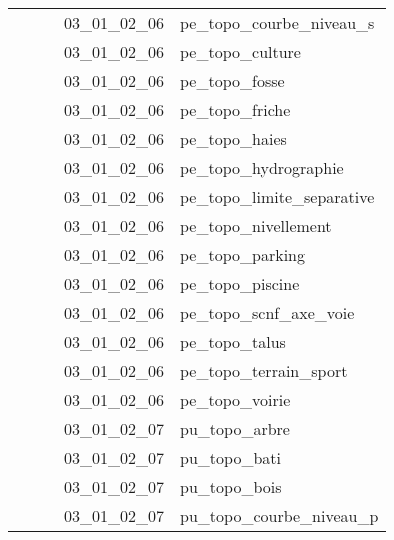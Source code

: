\documentclass[12pt,titlepage]{book}
\begin{document}
\begin{supertabular}{|p{7.5cm}|p{7.5cm}|p{7.5cm}|c|p{10cm}|}
                   &                    &                    & 03\_01\_02\_06 & pe\_topo\_courbe\_niveau\_s\\
                   &                    &                    & 03\_01\_02\_06 & pe\_topo\_culture\\
                   &                    &                    & 03\_01\_02\_06 & pe\_topo\_fosse\\
                   &                    &                    & 03\_01\_02\_06 & pe\_topo\_friche\\
                   &                    &                    & 03\_01\_02\_06 & pe\_topo\_haies\\
                   &                    &                    & 03\_01\_02\_06 & pe\_topo\_hydrographie\\
                   &                    &                    & 03\_01\_02\_06 & pe\_topo\_limite\_separative\\
                   &                    &                    & 03\_01\_02\_06 & pe\_topo\_nivellement\\
                   &                    &                    & 03\_01\_02\_06 & pe\_topo\_parking\\
                   &                    &                    & 03\_01\_02\_06 & pe\_topo\_piscine\\
                   &                    &                    & 03\_01\_02\_06 & pe\_topo\_scnf\_axe\_voie\\
                   &                    &                    & 03\_01\_02\_06 & pe\_topo\_talus\\
                   &                    &                    & 03\_01\_02\_06 & pe\_topo\_terrain\_sport\\
                   &                    &                    & 03\_01\_02\_06 & pe\_topo\_voirie\\
                   &                    &                    & 03\_01\_02\_07 & pu\_topo\_arbre\\
                   &                    &                    & 03\_01\_02\_07 & pu\_topo\_bati\\
                   &                    &                    & 03\_01\_02\_07 & pu\_topo\_bois\\
                   &                    &                    & 03\_01\_02\_07 & pu\_topo\_courbe\_niveau\_p\\

\end{supertabular}
\end{document}

